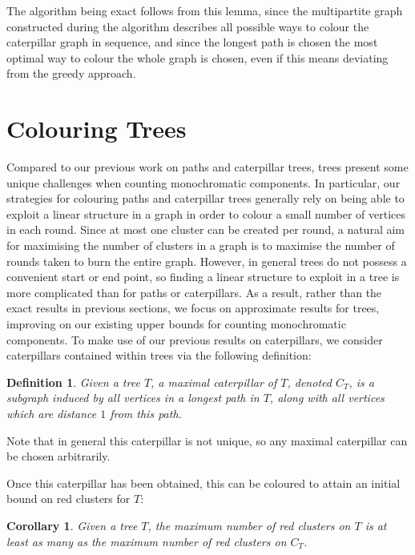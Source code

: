 \documentclass{mpaper}
\newtheorem{definition}[theorem]{Definition}
\newtheorem{corollary}[theorem]{Corollary}
\begin{document}
The algorithm being exact follows from this lemma, since the multipartite graph constructed during the algorithm describes all possible ways to colour the caterpillar graph in sequence, and since the longest path is chosen the most optimal way to colour the whole graph is chosen, even if this means deviating from the greedy approach.

\section{Colouring Trees}
\label{sec/trees}
\vspace{1em}

Compared to our previous work on paths and caterpillar trees, trees present some unique challenges when counting monochromatic components. In particular, our strategies for colouring paths and caterpillar trees generally rely on being able to exploit a linear structure in a graph in order to colour a small number of vertices in each round. Since at most one cluster can be created per round, a natural aim for maximising the number of clusters in a graph is to maximise the number of rounds taken to burn the entire graph. However, in general trees do not possess a convenient start or end point, so finding a linear structure to exploit in a tree is more complicated than for paths or caterpillars. As a result, rather than the exact results in previous sections, we focus on approximate results for trees, improving on our existing upper bounds for counting monochromatic components. To make use of our previous results on caterpillars, we consider caterpillars contained within trees via the following definition:

\begin{definition}
  \label{def/maximal-caterpillar}
  Given a tree $T$, a \emph{maximal caterpillar of $T$}, denoted $C_T$, is a subgraph induced by all vertices in a longest path in $T$, along with all vertices which are distance $1$ from this path.
\end{definition}

Note that in general this caterpillar is not unique, so any maximal caterpillar can be chosen arbitrarily.

Once this caterpillar has been obtained, this can be coloured to attain an initial bound on red clusters for $T$:

\begin{corollary}
  \label{cor/tree-caterpillar}
  Given a tree $T$, the maximum number of red clusters on $T$ is at least as many as the maximum number of red clusters on $C_T$.
\end{corollary}
\end{document}

